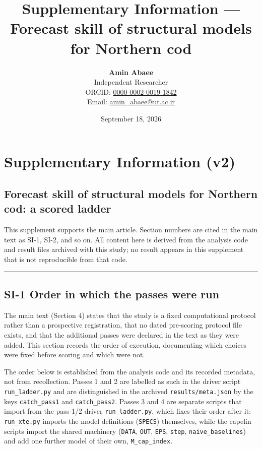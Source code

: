 \documentclass[11pt]{article}
\title{Supplementary Information — Forecast skill of structural models for Northern cod}
\author{\textbf{Amin Abaee}\\ Independent Researcher\\[2pt] ORCID: \href{https://orcid.org/0000-0002-0019-1842}{0000-0002-0019-1842}\\ Email: \href{mailto:amin_abaee@ut.ac.ir}{amin_abaee@ut.ac.ir}}
\date{September 18, 2026}
\begin{document}
\maketitle

\section{Supplementary Information
(v2)}\label{supplementary-information-v2}

\subsection{Forecast skill of structural models for Northern cod: a
scored
ladder}\label{forecast-skill-of-structural-models-for-northern-cod-a-scored-ladder}

This supplement supports the main article. Section numbers are cited in
the main text as SI-1, SI-2, and so on. All content here is derived from
the analysis code and result files archived with this study; no result
appears in this supplement that is not reproducible from that code.

\begin{center}\rule{0.5\linewidth}{0.5pt}\end{center}

\subsection{SI-1 Order in which the passes were
run}\label{si-1-order-in-which-the-passes-were-run}

The main text (Section 4) states that the study is a fixed computational
protocol rather than a prospective registration, that no dated
pre-scoring protocol file exists, and that the additional passes were
declared in the text as they were added. This section records the order
of execution, documenting which choices were fixed before scoring and
which were not.

The order below is established from the analysis code and its recorded
metadata, not from recollection. Passes 1 and 2 are labelled as such in
the driver script \texttt{run\_ladder.py} and are distinguished in the
archived \texttt{results/meta.json} by the keys \texttt{catch\_pass1}
and \texttt{catch\_pass2}. Passes 3 and 4 are separate scripts that
import from the pass-1/2 driver \texttt{run\_ladder.py}, which fixes
their order after it: \texttt{run\_xte.py} imports the model definitions
(\texttt{SPECS}) themselves, while the capelin scripts import the shared
machinery (\texttt{DATA}, \texttt{OUT}, \texttt{EPS}, \texttt{step},
\texttt{naive\_baselines}) and add one further model of their own,
\texttt{M\_cap\_index}.
\end{document}
